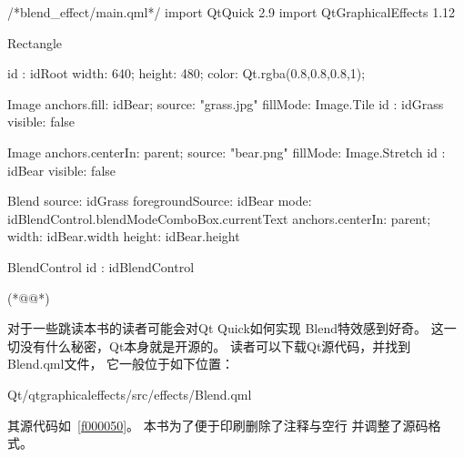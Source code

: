 \label{f000052}    %
\FloatBarrier                                  %
\begin{thebookfilesourceone}[escapeinside={(*@}{@*)},
caption=GoodLuck,
title=\filesourcenumbernameone \thefilesourcenumber
]
/*blend_effect/main.qml*/
import QtQuick 2.9
import QtGraphicalEffects 1.12

Rectangle {
    id : idRoot
    width: 640;
    height: 480;
    color: Qt.rgba(0.8,0.8,0.8,1);

    Image{
        anchors.fill: idBear;
        source: "grass.jpg"
        fillMode: Image.Tile
        id : idGrass
        visible: false
    }

    Image{
        anchors.centerIn: parent;
        source: "bear.png"
        fillMode: Image.Stretch
        id : idBear
        visible: false
    }

    Blend{
        source: idGrass
        foregroundSource: idBear
        mode: idBlendControl.blendModeComboBox.currentText
        anchors.centerIn: parent;
        width: idBear.width
        height: idBear.height
    }

    BlendControl {
        id : idBlendControl
    }

}(*@\marginpar[\hfill\setlength\fboxsep{2pt}\fbox{\footnotesize{\kaishu\parbox{1em}{\setlength{\baselineskip}{2pt}\filesourcenumbernameone}}\footnotesize{\thefilesourcenumber}}]{\setlength\fboxsep{2pt}\fbox{\footnotesize{\kaishu\parbox{1em}{\setlength{\baselineskip}{2pt}\filesourcenumbernameone}}\footnotesize{\thefilesourcenumber}}}@*)\end{thebookfilesourceone}          %
\addtocounter{lstlisting}{-1}   %


对于一些跳读本书的读者可能会对Qt Quick如何实现
Blend特效感到好奇。
这一切没有什么秘密，Qt本身就是开源的。
读者可以下载Qt源代码，并找到Blend.qml文件，
它一般位于如下位置：\begin{littlelongworld}
Qt/qtgraphicaleffects/src/effects/Blend.qml
\end{littlelongworld}
\hspace*{\parindent}其源代码如\filesourcenumbernameone\ \ref{f000050}。
本书为了便于印刷删除了注释与空行
并调整了源码格式。


